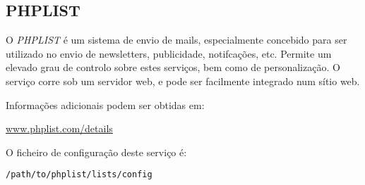 \subsection{PHPLIST}

O \emph{PHPLIST} é um sistema de envio de mails, especialmente concebido para ser utilizado no
envio de newsletters, publicidade, notifcações, etc. Permite um elevado grau de controlo
sobre estes serviços, bem como de personalização.
O serviço corre sob um servidor web, e pode ser facilmente integrado num sítio web.

Informações adicionais podem ser obtidas em:

\begin{normalsize}\sffamily\href{http://www.phplist.com/details}{www.phplist.com/details}\end{normalsize}

O ficheiro de configuração deste serviço é:

\begin{Verbatim}[commandchars=\\\{\}]
/path/to/phplist/lists/config
\end{Verbatim}
